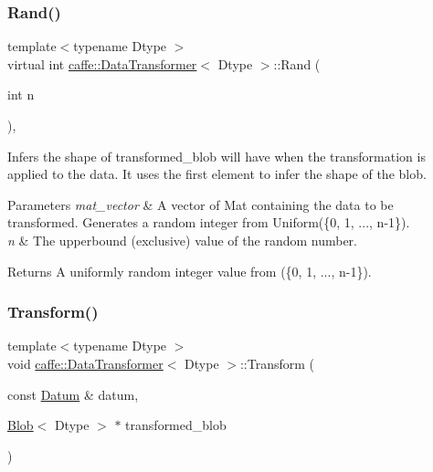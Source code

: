 \subsubsection{\texorpdfstring{Rand()}{Rand()}\hspace{0.1cm}{\footnotesize\ttfamily [2/2]}}
{\footnotesize\ttfamily template$<$typename Dtype $>$ \\
virtual int \mbox{\hyperlink{classcaffe_1_1_data_transformer}{caffe\+::\+Data\+Transformer}}$<$ Dtype $>$\+::Rand (\begin{DoxyParamCaption}\item[{int}]{n }\end{DoxyParamCaption})\hspace{0.3cm}{\ttfamily [protected]}, {\ttfamily [virtual]}}



Infers the shape of transformed\+\_\+blob will have when the transformation is applied to the data. It uses the first element to infer the shape of the blob. 


\begin{DoxyParams}{Parameters}
{\em mat\+\_\+vector} & A vector of Mat containing the data to be transformed. Generates a random integer from Uniform(\{0, 1, ..., n-\/1\}).\\
\hline
{\em n} & The upperbound (exclusive) value of the random number. \\
\hline
\end{DoxyParams}
\begin{DoxyReturn}{Returns}
A uniformly random integer value from (\{0, 1, ..., n-\/1\}). 
\end{DoxyReturn}
\mbox{\label{classcaffe_1_1_data_transformer_a1626db49587d506a91e7b70373ace816}} 
\subsubsection{\texorpdfstring{Transform()}{Transform()}\hspace{0.1cm}{\footnotesize\ttfamily [1/6]}}
{\footnotesize\ttfamily template$<$typename Dtype $>$ \\
void \mbox{\hyperlink{classcaffe_1_1_data_transformer}{caffe\+::\+Data\+Transformer}}$<$ Dtype $>$\+::Transform (\begin{DoxyParamCaption}\item[{const \mbox{\hyperlink{classcaffe_1_1_datum}{Datum}} \&}]{datum,  }\item[{\mbox{\hyperlink{classcaffe_1_1_blob}{Blob}}$<$ Dtype $>$ $\ast$}]{transformed\+\_\+blob }\end{DoxyParamCaption})}



